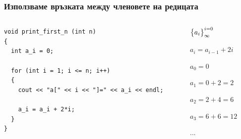 \documentclass{beamer}
\begin{document}
\begin{frame}[fragile]
\frametitle{Използваме връзката между членовете на редицата}


\begin{columns}[t]
  \begin{column}{0.7\textwidth}

\begin{lstlisting}
void print_first_n (int n)
{
  int a_i = 0;

  for (int i = 1; i <= n; i++)
  {
    cout << "a[" << i << "]=" << a_i << endl;

    a_i = a_i + 2*i;
  }
}
\end{lstlisting}


  \end{column}
  \begin{column}{0.3\textwidth}
\begin{flushleft}

  $\big{\{}a_i\big{\}}_\infty^{i=0}$

  \vspace{10px}

  $a_i = a_{i-1} + 2i$

  \vspace{30px}

  $a_0 = 0$

  $a_1 = 0 + 2 = 2$

  $a_2 = 2 + 4 = 6$

  $a_3 = 6 + 6 = 12$


  ...


\end{flushleft}
  \end{column}
\end{columns}

\end{frame}
\end{document}
